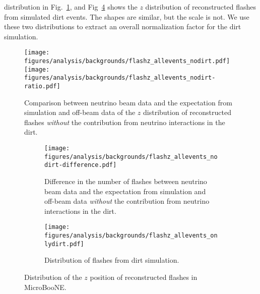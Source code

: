     distribution in Fig.~\ref{fig:flashnodirt}, and Fig~\ref{fig:flashdirt}
    shows the $z$ distribution of reconstructed flashes from simulated dirt
    events. The shapes are similar, but the scale is not. We use these two
    distributions to extract an overall normalization factor for the dirt
    simulation.
    \begin{figure}[ht]
      \centering
      \texttt{[image: figures/analysis/backgrounds/flashz\_allevents\_nodirt.pdf]} \\
      \texttt{[image: figures/analysis/backgrounds/flashz\_allevents\_nodirt-ratio.pdf]}
      \caption{Comparison between neutrino beam data and the expectation from
      simulation and off-beam data of the $z$ distribution of reconstructed
      flashes \textit{without} the contribution from neutrino interactions in
      the dirt.}
      \label{fig:flashnodirt}
    \end{figure}
    \begin{figure}[h]
      \centering
      \begin{subfigure}[t]{2.8in}
        \texttt{[image: figures/analysis/backgrounds/flashz\_allevents\_nodirt-difference.pdf]}
        \caption{Difference in the number of flashes between neutrino beam data
        and the expectation from simulation and off-beam data \textit{without}
        the contribution from neutrino interactions in the dirt.}
        \label{fig:flashsubtract}
      \end{subfigure}
      \hspace{2pt}
      \begin{subfigure}[t]{2.8in}
        \texttt{[image: figures/analysis/backgrounds/flashz\_allevents\_onlydirt.pdf]}
        \caption{Distribution of flashes from dirt simulation.}
        \label{fig:flashdirt}
      \end{subfigure}
      \caption{Distribution of the $z$ position of reconstructed flashes in
      MicroBooNE.}
    \end{figure}
    

